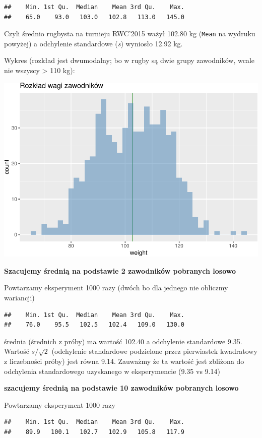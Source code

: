 \documentclass[
  openany]{book}
\begin{document}
\begin{verbatim}
##    Min. 1st Qu.  Median    Mean 3rd Qu.    Max. 
##    65.0    93.0   103.0   102.8   113.0   145.0
\end{verbatim}

Czyli średnio rugbysta na turnieju RWC'2015 ważył
102.80 kg (\texttt{Mean} na wydruku powyżej)
a odchylenie standardowe (\emph{s}) wyniosło 12.92 kg.

Wykres (rozkład jest dwumodalny; bo w rugby są dwie grupy zawodników, wcale
nie wszyscy \textgreater{} 110 kg):

\includegraphics{_main_files/figure-latex/unnamed-chunk-22-1.pdf}

\textbf{Szacujemy średnią na podstawie 2 zawodników pobranych losowo}

Powtarzamy eksperyment 1000 razy (dwóch bo dla jednego nie obliczmy
wariancji)

\begin{verbatim}
##    Min. 1st Qu.  Median    Mean 3rd Qu.    Max. 
##    76.0    95.5   102.5   102.4   109.0   130.0
\end{verbatim}

średnia (średnich z próby) ma wartość 102.40
a odchylenie standardowe 9.35.
Wartość \(s/\sqrt{2}\) (odchylenie standardowe podzielone przez pierwiastek kwadratowy
z liczebności próby) jest równa 9.14. Zauważmy że ta wartość
jest zbliżona do odchylenia standardowego uzyskanego
w eksperymencie (9.35 vs 9.14)

\textbf{szacujemy średnią na podstawie 10 zawodników pobranych losowo}

Powtarzamy eksperyment 1000 razy

\begin{verbatim}
##    Min. 1st Qu.  Median    Mean 3rd Qu.    Max. 
##    89.9   100.1   102.7   102.9   105.8   117.9
\end{verbatim}
\end{document}
